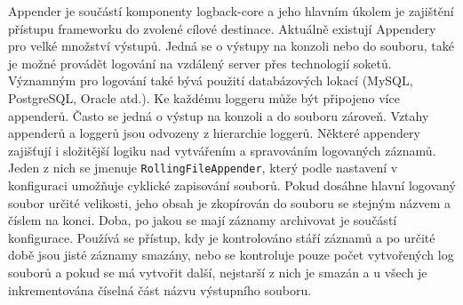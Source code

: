 \documentclass[ing,male,java,dept460]{diploma}		%
\begin{document}
\par Appender je součástí komponenty logback-core a jeho hlavním úkolem je zajištění přístupu frameworku do zvolené cílové destinace. Aktuálně existují Appendery pro velké množství výstupů. Jedná se o výstupy na konzoli nebo do souboru, také je možné provádět logování na vzdálený server přes technologií soketů. Významným pro logování také bývá použití databázových lokací (MySQL, PostgreSQL, Oracle atd.). Ke každému loggeru může být připojeno více appenderů. Často se jedná o výstup na konzoli a do souboru zároveň. Vztahy appenderů a loggerů jsou odvozeny z hierarchie loggerů. Některé appendery zajišťují i složitější logiku nad vytvářením a spravováním logovaných záznamů. Jeden z nich se jmenuje \texttt{RollingFileAppender}, který podle nastavení v konfiguraci umožňuje cyklické zapisování souborů. Pokud dosáhne hlavní logovaný soubor určité velikosti, jeho obsah je zkopírován do souboru se stejným názvem a číslem na konci. Doba, po jakou se mají záznamy archivovat je součástí konfigurace. Používá se přístup, kdy je kontrolováno stáří záznamů a po určité době jsou jisté záznamy smazány, nebo se kontroluje pouze počet vytvořených log souborů a pokud se má vytvořit další, nejstarší z nich je smazán a u všech je inkrementována číselná část názvu výstupního souboru\cite{logbackAppender}.
\end{document}
